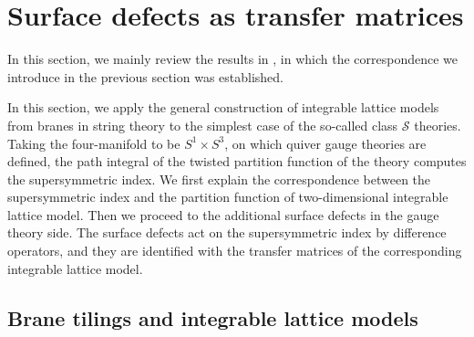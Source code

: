 \begin{comment}
\documentclass[11pt]{article}  %
\usepackage{Common/toshi}

\end{comment}




\newcommand{\fundbox}{\tikz{\node[fnode, semithick, minimum size=8pt] {}}}


\section{Surface defects as transfer matrices}


In this section, we mainly review the results in \cite{Maruyoshi:2016caf},
in which the correspondence we introduce in the previous section was established.


In this section, we apply the general construction of integrable lattice
models from branes in string theory to the simplest case of the so-called
class $\mathcal{S}$ theories. Taking the four-manifold to be $S^{1} \times S^{3}$,
on which quiver gauge theories are defined, the path integral of the
twisted partition function of the theory computes the supersymmetric
index. We first explain the correspondence between the supersymmetric
index and the partition function of two-dimensional integrable lattice
model. Then we proceed to the additional surface defects in the gauge
theory side. The surface defects act on the supersymmetric index by
difference operators, and they are identified with the transfer matrices
of the corresponding integrable lattice model.





\subsection{Brane tilings and integrable lattice models}

